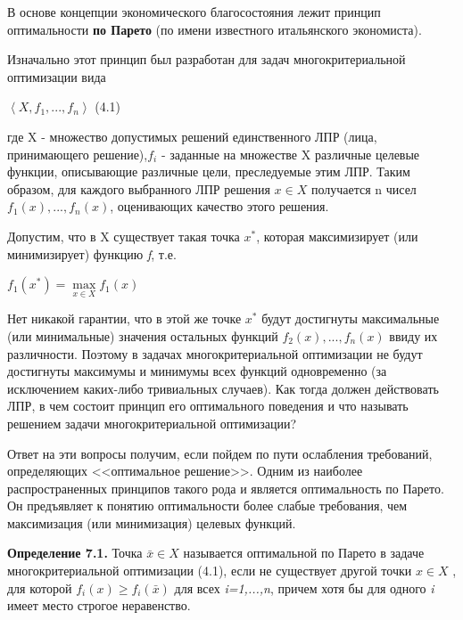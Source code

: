\documentclass[12pt, 4paper]{book}
\begin{document}
{В основе концепции экономического благосостояния лежит принцип оптимальности \textbf{по Парето} (по имени известного итальянского экономиста).
\par

Изначально этот принцип был разработан для задач многокритериальной оптимизации вида
\begin{center}
$\left\langle X,f_1,...,f_n \right\rangle$ (4.1)
\end{center}
где X - множество допустимых решений единственного ЛПР (лица, принимающего решение),$f_i$  - заданные на множестве X различные целевые функции, описывающие различные цели, преследуемые этим ЛПР. Таким образом, для каждого выбранного ЛПР решения $x \in X$ получается n чисел $f_1(x),...,f_n(x)$, оценивающих качество этого решения.
\par

Допустим, что в X существует такая точка $x^{*}$, которая максимизирует (или минимизирует) функцию \textit{f}, т.е.
\begin{center}
$f_1(x^{*})=\max\limits_{x \in X}f_1(x)$
\end{center}
\par

Нет никакой гарантии, что в этой же точке $x^{*}$ будут достигнуты максимальные (или минимальные) значения остальных функций $f_2(x),...,f_n(x)$ ввиду их различности. Поэтому в задачах многокритериальной оптимизации не будут достигнуты максимумы и минимумы всех функций одновременно (за исключением каких-либо тривиальных случаев). Как тогда должен действовать ЛПР, в чем состоит принцип его оптимального поведения и что называть решением задачи многокритериальной оптимизации?
\par

Ответ на эти вопросы получим, если пойдем по пути ослабления требований, определяющих <<оптимальное решение>>. Одним из наиболее распространенных принципов такого рода и является оптимальность по Парето. Он предъявляет к понятию оптимальности более слабые требования, чем максимизация (или минимизация) целевых функций.
\par

\textbf{Определение 7.1.} Точка $\bar{x} \in X$  называется оптимальной по Парето в задаче многокритериальной оптимизации (4.1), если не существует другой точки $x \in X$ , для которой $f_i(x) \geq f_{i}(\bar{x})$ для всех \textit{i=1,...,n}, причем хотя бы для одного \textit{i} имеет место строгое неравенство.
\par

}
\end{document}
